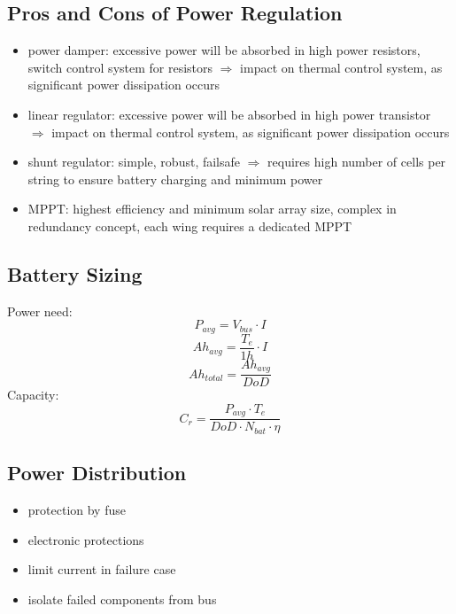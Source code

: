 \subsection{Pros and Cons of Power Regulation}
\begin{itemize}
 \item power damper: excessive power will be absorbed in high power resistors, switch control system for resistors $\Rightarrow$ impact on thermal control system, as significant power 
 dissipation occurs 
 \item linear regulator: excessive power will be absorbed in high power transistor $\Rightarrow$ impact on thermal control system, as significant power dissipation occurs 
 \item shunt regulator: simple, robust, failsafe $\Rightarrow$ requires high number of cells per string to ensure battery charging and minimum power 
 \item MPPT: highest efficiency and minimum solar array size, complex in redundancy concept, each wing requires a dedicated MPPT
\end{itemize}
\subsection{Battery Sizing}
Power need:
\[P_{avg} = V_{bus}\cdot I\]
\[Ah_{avg} = \frac{T_e}{1h}\cdot I\]
\[Ah_{total} = \frac{Ah_{avg}}{DoD}\]
Capacity:
\[C_r = \frac{P_{avg}\cdot T_e}{DoD\cdot N_{bat} \cdot \eta}\]
\subsection{Power Distribution}
\begin{itemize}
 \item protection by fuse
 \item electronic protections
 \item limit current in failure case
 \item isolate failed components from bus
\end{itemize}
